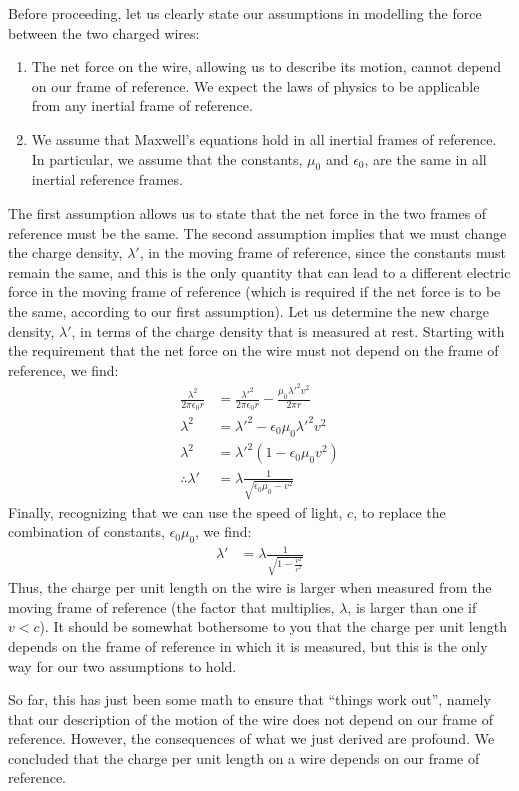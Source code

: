 Before proceeding, let us clearly state our assumptions in modelling the force between the two charged wires:
\begin{enumerate}
\item The net force on the wire, allowing us to describe its motion, cannot depend on our frame of reference. We expect the laws of physics to be applicable from any inertial frame of reference.
\item We assume that Maxwell's equations hold in all inertial frames of reference. In particular, we assume that the constants, $\mu_0$ and $\epsilon_0$, are the same in all inertial reference frames.
\end{enumerate}
The first assumption allows us to state that the net force in the two frames of reference must be the same. The second assumption implies that we must change the charge density, $\lambda'$, in the moving frame of reference, since the constants must remain the same, and this is the only quantity that can lead to a different electric force in the moving frame of reference (which is required if the net force is to be the same, according to our first assumption). Let us determine the new charge density, $\lambda'$, in terms of the charge density that is measured at rest. Starting with the requirement that the net force on the wire must not depend on the frame of reference, we find:
\begin{align*}
\frac{\lambda^2}{2\pi \epsilon_0r}&=\frac{\lambda'^2}{2\pi \epsilon_0r}  -\frac{\mu_0 \lambda'^2 v^2}{2\pi r}\\
\lambda^2&=\lambda'^2-\epsilon_0\mu_0\lambda'^2 v^2\\
\lambda^2&=\lambda'^2(1-\epsilon_0\mu_0v^2)\\
\therefore \lambda'&=\lambda \frac{1}{\sqrt{\epsilon_0\mu_0-v^2}}
\end{align*}
Finally, recognizing that we can use the speed of light, $c$, to replace the combination of constants, $\epsilon_0\mu_0$, we find:
\begin{align*}
\lambda'&=\lambda \frac{1}{\sqrt{1-\frac{v^2}{c^2}}}
\end{align*}
Thus, the charge per unit length on the wire is larger when measured from the moving frame of reference (the factor that multiplies, $\lambda$, is larger than one if $v<c$). It should be somewhat bothersome to you that the charge per unit length depends on the frame of reference in which it is measured, but this is the only way for our two assumptions to hold.

So far, this has just been some math to ensure that ``things work out'', namely that our description of the motion of the wire does not depend on our frame of reference. However, the consequences of what we just derived are profound. We concluded that the charge per unit length on a wire depends on our frame of reference.

